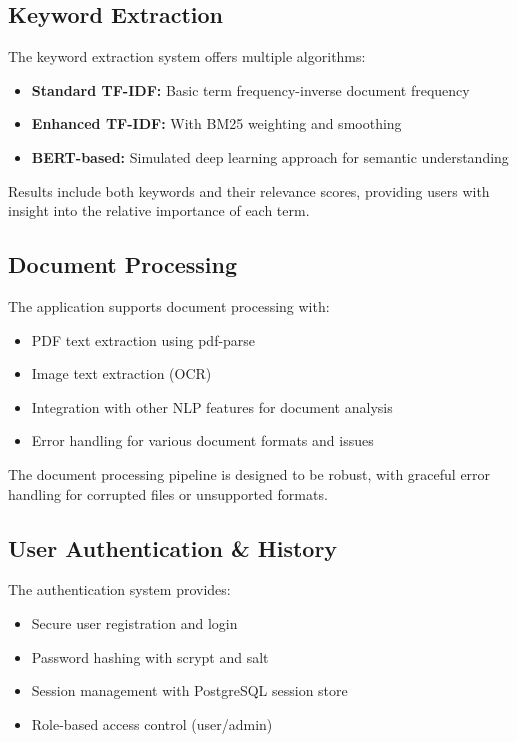 \documentclass[12pt,a4paper]{article}
\begin{document}
\subsection{Keyword Extraction}

The keyword extraction system offers multiple algorithms:

\begin{itemize}
    \item \textbf{Standard TF-IDF:} Basic term frequency-inverse document frequency
    \item \textbf{Enhanced TF-IDF:} With BM25 weighting and smoothing
    \item \textbf{BERT-based:} Simulated deep learning approach for semantic understanding
\end{itemize}

Results include both keywords and their relevance scores, providing users with insight into the relative importance of each term.

\subsection{Document Processing}

The application supports document processing with:

\begin{itemize}
    \item PDF text extraction using pdf-parse
    \item Image text extraction (OCR)
    \item Integration with other NLP features for document analysis
    \item Error handling for various document formats and issues
\end{itemize}

The document processing pipeline is designed to be robust, with graceful error handling for corrupted files or unsupported formats.

\subsection{User Authentication \& History}

The authentication system provides:

\begin{itemize}
    \item Secure user registration and login
    \item Password hashing with scrypt and salt
    \item Session management with PostgreSQL session store
    \item Role-based access control (user/admin)
\end{itemize}
\end{document}
